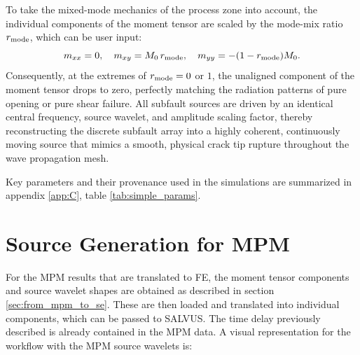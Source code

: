 To take the mixed-mode mechanics of the process zone into account, the individual components of the moment tensor are  scaled by the mode-mix ratio $r_{\rm mode}$, which can be user input:
\[ m_{xx}=0,\quad m_{xy}=M_0\,r_{\rm mode},\quad m_{yy}=-(1-r_{\rm mode})M_0. \]
Consequently, at the extremes of $r_{\rm mode}=0$ or $1$, the unaligned component of the moment tensor drops to zero, perfectly matching the radiation patterns of pure opening or pure shear failure. All subfault sources are driven by an identical central frequency, source wavelet, and amplitude scaling factor, thereby reconstructing the discrete subfault array into a highly coherent, continuously moving source that mimics a smooth, physical crack tip rupture throughout the wave propagation mesh. \par



Key parameters and their provenance used in the simulations are summarized in appendix \ref{app:C}, table \ref{tab:simple_params}. 

\section{Source Generation for MPM}

For the MPM results that are translated to FE, the moment tensor components and source wavelet shapes are obtained as described in section \ref{sec:from_mpm_to_se}. These are then loaded and translated into individual components, which can be passed to SALVUS. The time delay previously described is already contained in the MPM data. A visual representation for the workflow with the MPM source wavelets is: 


